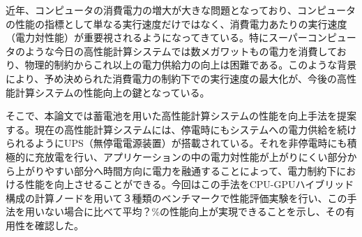 近年、コンピュータの消費電力の増大が大きな問題となっており、コンピュータの性能の指標として単なる実行速度だけではなく、消費電力あたりの実行速度（電力対性能）が重要視されるようになってきている。特にスーパーコンピュータのような今日の高性能計算システムでは数メガワットもの電力を消費しており、物理的制約からこれ以上の電力供給力の向上は困難である。このような背景により、予め決められた消費電力の制約下での実行速度の最大化が、今後の高性能計算システムの性能向上の鍵となっている。

そこで、本論文では蓄電池を用いた高性能計算システムの性能を向上手法を提案する。現在の高性能計算システムには、停電時にもシステムへの電力供給を続けられるようにUPS（無停電電源装置）が搭載されている。それを非停電時にも積極的に充放電を行い、アプリケーションの中の電力対性能が上がりにくい部分から上がりやすい部分へ時間方向に電力を融通することによって、電力制約下における性能を向上させることができる。今回はこの手法をCPU-GPUハイブリッド構成の計算ノードを用いて３種類のベンチマークで性能評価実験を行い、この手法を用いない場合に比べて平均？\%の性能向上が実現できることを示し、その有用性を確認した。
